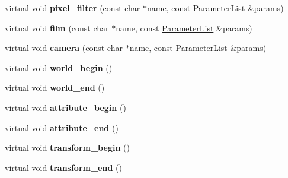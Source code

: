 \begin{DoxyCompactItemize}
\item 
\mbox{\label{structpbrt_1_1_importer_a2a7ffee63a4efc1584175b4bab062ead}} 
virtual void {\bfseries pixel\+\_\+filter} (const char $\ast$name, const \hyperlink{structpbrt_1_1_parameter_list}{Parameter\+List} \&params)
\item 
\mbox{\label{structpbrt_1_1_importer_a9d6d8d5463b17947f888332e7f037cde}} 
virtual void {\bfseries film} (const char $\ast$name, const \hyperlink{structpbrt_1_1_parameter_list}{Parameter\+List} \&params)
\item 
\mbox{\label{structpbrt_1_1_importer_ad32d5d9b0b6c938e94137e34fe2b2f92}} 
virtual void {\bfseries camera} (const char $\ast$name, const \hyperlink{structpbrt_1_1_parameter_list}{Parameter\+List} \&params)
\item 
\mbox{\label{structpbrt_1_1_importer_a40be5063644721ab0ee50d3320834837}} 
virtual void {\bfseries world\+\_\+begin} ()
\item 
\mbox{\label{structpbrt_1_1_importer_aa0a6e76845d93511e1680b9e5a7c217d}} 
virtual void {\bfseries world\+\_\+end} ()
\item 
\mbox{\label{structpbrt_1_1_importer_aea4f5622247e103e64fdde3d65bb7955}} 
virtual void {\bfseries attribute\+\_\+begin} ()
\item 
\mbox{\label{structpbrt_1_1_importer_af7b4940c59aa41ced5802d4d975602b3}} 
virtual void {\bfseries attribute\+\_\+end} ()
\item 
\mbox{\label{structpbrt_1_1_importer_a8d2ec468685a9c598473562a52f2843d}} 
virtual void {\bfseries transform\+\_\+begin} ()
\item 
\mbox{\label{structpbrt_1_1_importer_ae187c3d682040367079c869511dd947b}} 
virtual void {\bfseries transform\+\_\+end} ()
\item 
\mbox{\label{structpbrt_1_1_importer_aac365d8a10c66c87d964bab9fc1e9056}} 

\end{DoxyCompactItemize}
